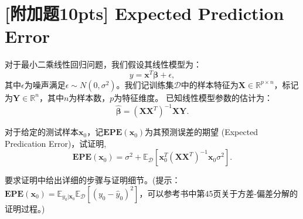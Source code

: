 \documentclass[a4paper,UTF8]{article}
\numberwithin{equation}{section}
\begin{document}
\newpage
\section{[附加题10pts] Expected Prediction Error}
对于最小二乘线性回归问题，我们假设其线性模型为：
\begin{equation}
	y=\textbf{x}^T  \bm{ \beta } + \epsilon , 
\end{equation}
其中$\epsilon$为噪声满足$\epsilon\sim N(0,\sigma^2)$。我们记训练集$\mathcal{D}$中的样本特征为$\textbf{X}\in \mathbb{R}^{p \times n}$，标记为$\textbf{Y}\in \mathbb{R}^{n}$，其中$n$为样本数，$p$为特征维度。
已知线性模型参数的估计为：
\begin{equation}
	\hat{\bm{\beta}}=(\textbf{X}\textbf{X}^T)^{-1}\textbf{X}\textbf{Y}.	
\end{equation}

对于给定的测试样本$\textbf{x}_0$，记$\mathbf{EPE}(\textbf{x}_0)$为其预测误差的期望 (Expected Predication Error)，试证明,
\[
	\mathbf{EPE}(\textbf{x}_0) = \sigma^2+\mathbb{E}_{\mathcal{D}}[\textbf{x}_0^T(\textbf{X}\textbf{X}^T)^{-1}\textbf{x}_0\sigma^2].
\]

要求证明中给出详细的步骤与证明细节。(提示：$\mathbf{EPE}(\textbf{x}_0)=\mathbb{E}_{y_0|\textbf{x}_0} \mathbb{E}_{\mathcal{D}}[(y_0-\hat{y}_0)^2]$，可以参考书中第45页关于方差-偏差分解的证明过程。)
\end{document}
